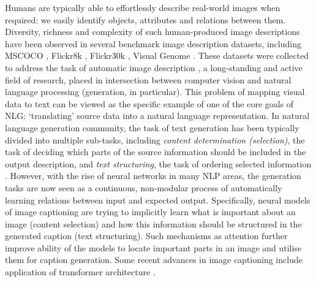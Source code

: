 \documentclass[11pt,a4paper]{article}
\begin{document}





\iffalse
Humans are typically able to effortlessly describe real-world images when required: we easily identify objects, attributes and relations between them.
Diversity, richness and complexity of such human-produced image descriptions have been observed in several benchmark image description datasets, including MSCOCO \cite{lin2014microsoft,chen2015microsoft}, Flickr8k \cite{hodosh2013}, Flickr30k \cite{young-etal-2014-image}, Visual Genome \cite{krishnavisualgenome}.
These datasets were collected to address the task of automatic image description \cite{bernardi2016automatic}, a long-standing and active field of research, placed in intersection between computer vision and natural language processing (generation, in particular).
This problem of mapping visual data to text can be viewed as the specific example of one of the core goals of NLG: `translating' source data into a natural language representation.
In natural language generation community, the task of text generation has been typically divided into multiple sub-tasks, including \textit{content determination (selection)}, the task of deciding which parts of the source information should be included in the output description, and \textit{text structuring}, the task of ordering selected information \cite{Gatt2017}.
However, with the rise of neural networks in many NLP areas, the generation tasks are now seen as a continuous, non-modular process of automatically learning relations between input and expected output. Specifically, neural models of image captioning \cite{kiros14,vinyals2014tell} are trying to implicitly learn what is important about an image (content selection) and how this information should be structured in the generated caption (text structuring).
Such mechanisms as attention \cite{xu2015attend,anderson2017bottomup} further improve ability of the models to locate important parts in an image and utilise them for caption generation. Some recent advances in image captioning include application of transformer architecture \cite{vaswani2017attention,herdade2019image}.

\end{document}
